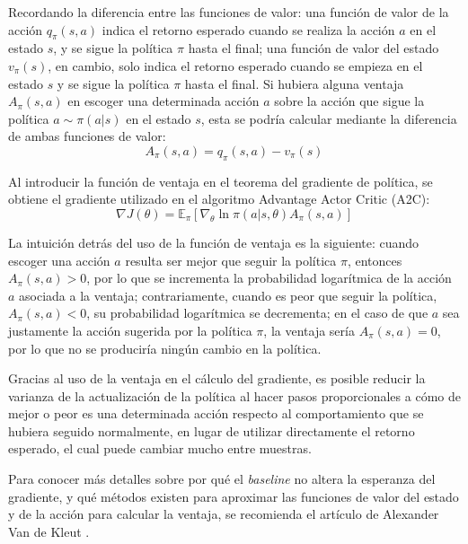 Recordando la diferencia entre las funciones de valor: una función de valor de la acción $q_\pi(s,a)$ indica el retorno esperado cuando se realiza la acción $a$ en el estado $s$, y se sigue la política $\pi$ hasta el final; una función de valor del estado $v_\pi(s)$, en cambio, solo indica el retorno esperado cuando se empieza en el estado $s$ y se sigue la política $\pi$ hasta el final. Si hubiera alguna ventaja $A_{\pi}(s,a)$ en escoger una determinada acción $a$ sobre la acción que sigue la política $a \sim \pi(a|s)$ en el estado $s$, esta se podría calcular mediante la diferencia de ambas funciones de valor:
\begin{equation}
    A_{\pi}(s,a) = q_\pi(s,a) - v_\pi(s)
\end{equation} 

Al introducir la función de ventaja en el teorema del gradiente de política, se obtiene el gradiente utilizado en el algoritmo Advantage Actor Critic (A2C):
\begin{equation}
        \nabla J(\theta) = \mathbb{E}_\pi\left[\nabla_\theta \ln \pi(a|s,\theta) A_\pi(s,a) \right]
    \label{a2c}
\end{equation}

\newpage

La intuición detrás del uso de la función de ventaja es la siguiente: cuando escoger una acción $a$ resulta ser mejor que seguir la política $\pi$, entonces $A_\pi(s,a) > 0$, por lo que se incrementa la probabilidad logarítmica de la acción $a$ asociada a la ventaja; contrariamente, cuando es peor que seguir la política, $A_\pi(s,a) < 0$, su probabilidad logarítmica se decrementa; en el caso de que $a$ sea justamente la acción sugerida por la política $\pi$, la ventaja sería $A_\pi(s,a) = 0$, por lo que no se produciría ningún cambio en la política.

Gracias al uso de la ventaja en el cálculo del gradiente, es posible reducir la varianza de la actualización de la política al hacer pasos proporcionales a cómo de mejor o peor es una determinada acción respecto al comportamiento que se hubiera seguido normalmente, en lugar de utilizar directamente el retorno esperado, el cual puede cambiar mucho entre muestras.

Para conocer más detalles sobre por qué el \emph{baseline} no altera la esperanza del gradiente, y qué métodos existen para aproximar las funciones de valor del estado y de la acción para calcular la ventaja, se recomienda el artículo de Alexander Van de Kleut \cite{alexander-van-de-kleut}.

